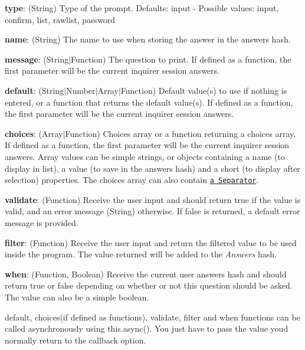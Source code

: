 \begin{DoxyItemize}
\item {\bfseries type}\+: (String) Type of the prompt. Defaults\+: {\ttfamily input} -\/ Possible values\+: {\ttfamily input}, {\ttfamily confirm}, {\ttfamily list}, {\ttfamily rawlist}, {\ttfamily password}
\item {\bfseries name}\+: (String) The name to use when storing the answer in the answers hash.
\item {\bfseries message}\+: (String$\vert$\+Function) The question to print. If defined as a function, the first parameter will be the current inquirer session answers.
\item {\bfseries default}\+: (String$\vert$\+Number$\vert$\+Array$\vert$\+Function) Default value(s) to use if nothing is entered, or a function that returns the default value(s). If defined as a function, the first parameter will be the current inquirer session answers.
\item {\bfseries choices}\+: (Array$\vert$\+Function) Choices array or a function returning a choices array. If defined as a function, the first parameter will be the current inquirer session answers. Array values can be simple {\ttfamily strings}, or {\ttfamily objects} containing a {\ttfamily name} (to display in list), a {\ttfamily value} (to save in the answers hash) and a {\ttfamily short} (to display after selection) properties. The choices array can also contain \href{#separator}{\tt a {\ttfamily Separator}}.
\item {\bfseries validate}\+: (Function) Receive the user input and should return {\ttfamily true} if the value is valid, and an error message ({\ttfamily String}) otherwise. If {\ttfamily false} is returned, a default error message is provided.
\item {\bfseries filter}\+: (Function) Receive the user input and return the filtered value to be used inside the program. The value returned will be added to the {\itshape Answers} hash.
\item {\bfseries when}\+: (Function, Boolean) Receive the current user answers hash and should return {\ttfamily true} or {\ttfamily false} depending on whether or not this question should be asked. The value can also be a simple boolean.
\end{DoxyItemize}

{\ttfamily default}, {\ttfamily choices}(if defined as functions), {\ttfamily validate}, {\ttfamily filter} and {\ttfamily when} functions can be called asynchronously using {\ttfamily this.\+async()}. You just have to pass the value you\textquotesingle{}d normally return to the callback option.


